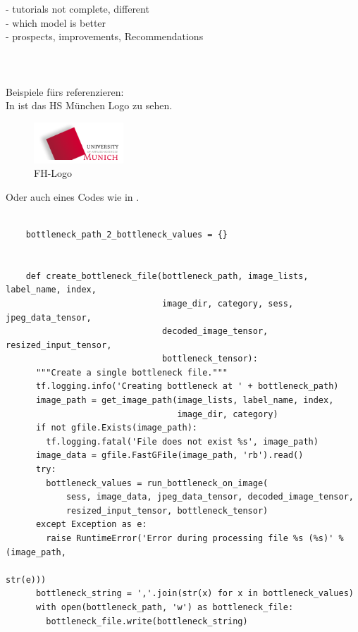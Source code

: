 - tutorials not complete, different \\
- which model is better \\
- prospects, improvements, Recommendations \\
\\
\\ \\
Beispiele fürs referenzieren: \\
In  ist das HS München Logo zu sehen.

\begin{figure}[htbp]
\includegraphics[width=0.3\textwidth]{includes/MUASlogo}
\caption{FH-Logo}
\label{fig:FH-Logo}
\end{figure}

Oder auch eines Codes wie in  .\\
\begin{lstlisting}[caption=Some python code, label=list:python_Code]

	bottleneck_path_2_bottleneck_values = {}


	def create_bottleneck_file(bottleneck_path, image_lists, label_name, index,
	                           image_dir, category, sess, jpeg_data_tensor,
	                           decoded_image_tensor, resized_input_tensor,
	                           bottleneck_tensor):
	  """Create a single bottleneck file."""
	  tf.logging.info('Creating bottleneck at ' + bottleneck_path)
	  image_path = get_image_path(image_lists, label_name, index,
	                              image_dir, category)
	  if not gfile.Exists(image_path):
	    tf.logging.fatal('File does not exist %s', image_path)
	  image_data = gfile.FastGFile(image_path, 'rb').read()
	  try:
	    bottleneck_values = run_bottleneck_on_image(
	        sess, image_data, jpeg_data_tensor, decoded_image_tensor,
	        resized_input_tensor, bottleneck_tensor)
	  except Exception as e:
	    raise RuntimeError('Error during processing file %s (%s)' % (image_path,
	                                                                 str(e)))
	  bottleneck_string = ','.join(str(x) for x in bottleneck_values)
	  with open(bottleneck_path, 'w') as bottleneck_file:
	    bottleneck_file.write(bottleneck_string)
\end{lstlisting}

